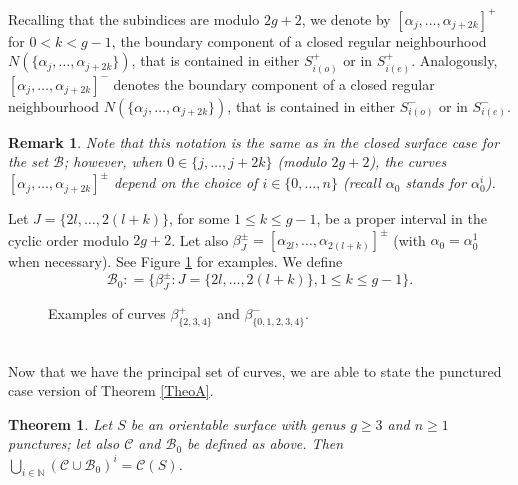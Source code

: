 \documentclass[twoside,11pt,a4paper]{article}
\newtheorem{Teo}[Def]{Theorem}
\newtheorem{Rem}[Def]{Remark}
\newcommand*{\ccomp}[1]{\mathcal{C}(#1)}
\newcommand*{\nat}{\mathbb{N}}
\newcommand*{\Cf}{\mathscr{C}}
\newcommand*{\Bf}{\mathscr{B}}
\newcommand*{\Bfn}{\Bf_{0}}
\newcommand*{\ColonEqq}{\mathrel{\mathop:}=}
\begin{document}
\indent Recalling that the subindices are modulo $2g+2$, we denote by $[\alpha_{j}, \ldots, \alpha_{j + 2k}]^{+}$ for $0 < k < g-1$, the boundary component of a closed regular neighbourhood $N(\{\alpha_{j}, \ldots, \alpha_{j + 2k}\})$, that is contained in either $S_{i(o)}^{+}$ or in $S_{i(e)}^{+}$. Analogously, $[\alpha_{j}, \ldots, \alpha_{j + 2k}]^{-}$ denotes the boundary component of a closed regular neighbourhood $N(\{\alpha_{j}, \ldots, \alpha_{j + 2k}\})$, that is contained in either $S_{i(o)}^{-}$ or in $S_{i(e)}^{-}$. 
\begin{Rem}
 Note that this notation is the same as in the closed surface case for the set $\Bf$; however, when $0 \in \{j, \ldots, j+2k\}$ (modulo $2g+2$), the curves $[\alpha_{j}, \ldots, \alpha_{j+2k}]^{\pm}$ depend on the choice of $i \in \{0, \ldots, n\}$ (recall $\alpha_{0}$ stands for $\alpha_{0}^{i}$).
\end{Rem}
\indent Let $J = \{2l, \ldots, 2(l+k)\}$, for some $1 \leq k \leq g-1$, be a proper interval in the cyclic order modulo $2g+2$. Let also $\beta_{J}^{\pm} = [\alpha_{2l}, \ldots, \alpha_{2(l+k)}]^{\pm}$ (with $\alpha_{0} = \alpha_{0}^{1}$ when necessary). See Figure \ref{ExamplesBf0} for examples. We define $$\Bf_{0} \ColonEqq \{\beta_{J}^{\pm} : J = \{2l, \ldots, 2(l+k)\}, 1 \leq k \leq g-1\}.$$
\begin{figure}[h]
 \begin{center}
  \resizebox{10cm}{!}{}\caption{Examples of curves $\beta_{\{2,3,4\}}^{+}$ and $\beta_{\{0,1,2,3,4\}}^{-}$.}\label{ExamplesBf0}
 \end{center}
\end{figure}\\
\indent Now that we have the principal set of curves, we are able to state the punctured case version of Theorem \ref{TheoA}.
\begin{Teo}\label{Thm3}
 Let $S$ be an orientable surface with genus $g \geq 3$ and $n \geq 1$ punctures; let also $\Cf$ and $\Bf_{0}$ be defined as above. Then $\bigcup_{i \in \nat} (\Cf \cup \Bfn)^{i} = \ccomp{S}$.
\end{Teo}
\end{document}
